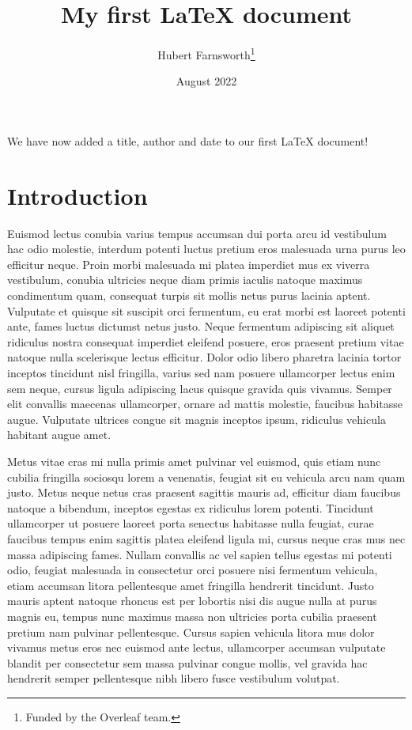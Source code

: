 \documentclass[12pt, letterpaper]{article}
\title{My first LaTeX document}
\author{Hubert Farnsworth\thanks{Funded by the Overleaf team.}}
\date{August 2022}
\begin{document}
\maketitle
We have now added a title, author and date to our first \LaTeX{} document!

\section{Introduction}
Euismod lectus conubia varius tempus accumsan dui porta arcu id vestibulum
hac odio molestie, interdum potenti luctus pretium eros malesuada urna purus
leo efficitur neque.
Proin morbi malesuada mi platea imperdiet mus ex viverra vestibulum,
conubia ultricies neque diam primis iaculis natoque maximus condimentum quam, consequat turpis sit mollis netus purus lacinia aptent. Vulputate et quisque sit suscipit orci fermentum, eu erat morbi est laoreet potenti ante, fames luctus dictumst netus justo. Neque fermentum adipiscing sit aliquet ridiculus nostra consequat imperdiet eleifend posuere, eros praesent pretium vitae natoque nulla scelerisque lectus efficitur. Dolor odio libero pharetra lacinia tortor inceptos tincidunt nisl fringilla, varius sed nam posuere ullamcorper lectus enim sem neque, cursus ligula adipiscing lacus quisque gravida quis vivamus. Semper elit convallis maecenas ullamcorper, ornare ad mattis molestie, faucibus habitasse augue. Vulputate ultrices congue sit magnis inceptos ipsum, ridiculus vehicula habitant augue amet.

Metus vitae cras mi nulla primis amet pulvinar vel euismod, quis etiam nunc cubilia fringilla sociosqu lorem a venenatis, feugiat sit eu vehicula arcu nam quam justo. Metus neque netus cras praesent sagittis mauris ad, efficitur diam faucibus natoque a bibendum, inceptos egestas ex ridiculus lorem potenti. Tincidunt ullamcorper ut posuere laoreet porta senectus habitasse nulla feugiat, curae faucibus tempus enim sagittis platea eleifend ligula mi, cursus neque cras mus nec massa adipiscing fames. Nullam convallis ac vel sapien tellus egestas mi potenti odio, feugiat malesuada in consectetur orci posuere nisi fermentum vehicula, etiam accumsan litora pellentesque amet fringilla hendrerit tincidunt. Justo mauris aptent natoque rhoncus est per lobortis nisi dis augue nulla at purus magnis eu, tempus nunc maximus massa non ultricies porta cubilia praesent pretium nam pulvinar pellentesque. Cursus sapien vehicula litora mus dolor vivamus metus eros nec euismod ante lectus, ullamcorper accumsan vulputate blandit per consectetur sem massa pulvinar congue mollis, vel gravida hac hendrerit semper pellentesque nibh libero fusce vestibulum volutpat.
\end{document}
